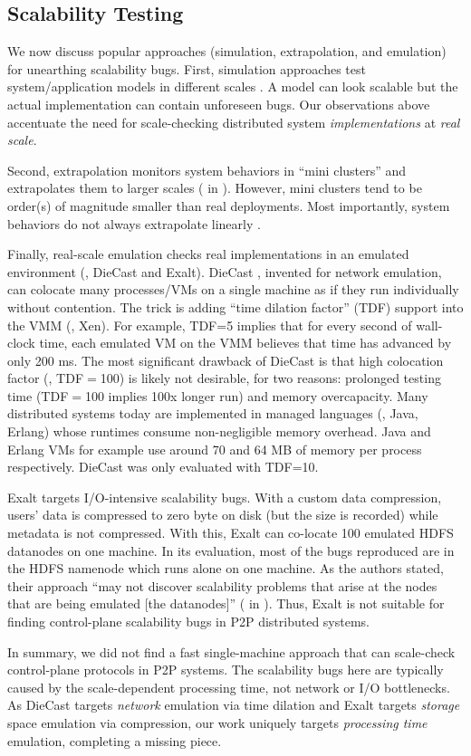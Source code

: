\subsection{Scalability Testing}

We now discuss popular approaches (simulation, extrapolation, and emulation) for
unearthing scalability bugs.
First, simulation approaches test system/application models in different scales
\cite{Calotoiu+13-ApmScaleBug, Laguna+15-DebugAtScale}. A model can look
scalable but the actual implementation can contain unforeseen bugs. Our
observations above accentuate the need for scale-checking distributed system
{\em implementations} at {\em real scale}.

Second, extrapolation monitors system behaviors in ``mini clusters'' and
extrapolates them to larger scales ( in \cite{Wang+14-Exalt}).  However,
mini clusters tend to be order(s) of magnitude smaller than real deployments.
Most importantly, system behaviors do not always extrapolate linearly
\cite{Wang+14-Exalt}. 

Finally, real-scale emulation checks real implementations in an emulated
environment (\eg, DieCast and Exalt).  DieCast \cite{Gupta+08-DieCast},
invented for network emulation, can colocate many processes/VMs on a single
machine as if they run individually without contention.  The trick is adding
``time dilation factor'' (TDF) support \cite{Gupta+06-TimeDilation} into the
VMM (\eg, Xen).  For example, TDF=5 implies that for every second of wall-clock
time, each emulated VM on the VMM believes that time has advanced by only 200
ms.  The most significant drawback of DieCast is that high colocation factor
(\eg, TDF$=$100) is likely not desirable, for two reasons: prolonged testing
time (TDF$=$100 implies 100x longer run) and memory overcapacity.  Many
distributed systems today are implemented in managed languages (\eg, Java,
Erlang) whose runtimes consume non-negligible memory overhead. Java and Erlang
VMs for example use around 70 and 64 MB of memory per process respectively.
DieCast was only evaluated with TDF=10.

Exalt \cite{Wang+14-Exalt} targets I/O-intensive scalability bugs.  With a
custom data compression, users' data is compressed to zero byte on disk (but the
size is recorded) while metadata is not compressed.  With this, Exalt can
co-locate 100 emulated HDFS datanodes on one machine.  In its evaluation, most
of the bugs reproduced are in the HDFS namenode which runs alone on one machine.
As the authors stated, their approach ``may not discover scalability problems
that arise at the nodes that are being emulated [the datanodes]'' ( in
\cite{Wang+14-Exalt}).  Thus, Exalt is not suitable for finding control-plane
scalability bugs in P2P distributed systems.

In summary, we did not find a fast single-machine approach that can scale-check
control-plane protocols in P2P systems.  The scalability bugs here are
typically caused by the scale-dependent processing time, not network or I/O
bottlenecks.  As DieCast targets {\em network} emulation via time dilation and
Exalt targets {\em storage} space emulation via compression, our work uniquely
targets {\em processing time} emulation, completing a missing piece.

